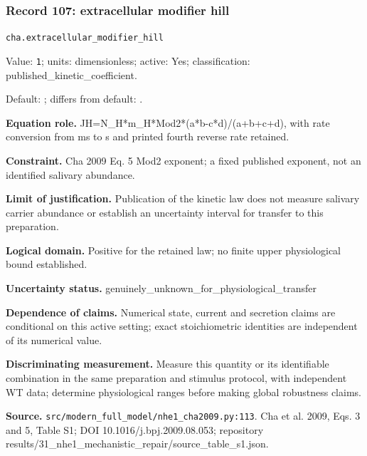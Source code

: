 \subsubsection*{Record 107: extracellular modifier hill}
{\small \nolinkurl{cha.extracellular_modifier_hill}\par

Value: \texttt{1}; units: dimensionless; active: Yes; classification: published\_kinetic\_coefficient.\par

Default: ; differs from default: .\par

\textbf{Equation role.} JH=N\_H*m\_H*Mod2*(a*b-c*d)/(a+b+c+d), with rate conversion from ms to s and printed fourth reverse rate retained.\par

\textbf{Constraint.} Cha 2009 Eq. 5 Mod2 exponent; a fixed published exponent, not an identified salivary abundance.\par

\textbf{Limit of justification.} Publication of the kinetic law does not measure salivary carrier abundance or establish an uncertainty interval for transfer to this preparation.\par

\textbf{Logical domain.} Positive for the retained law; no finite upper physiological bound established.\par

\textbf{Uncertainty status.} genuinely\_unknown\_for\_physiological\_transfer\par

\textbf{Dependence of claims.} Numerical state, current and secretion claims are conditional on this active setting; exact stoichiometric identities are independent of its numerical value.\par

\textbf{Discriminating measurement.} Measure this quantity or its identifiable combination in the same preparation and stimulus protocol, with independent WT data; determine physiological ranges before making global robustness claims.\par

\textbf{Source.} \nolinkurl{src/modern_full_model/nhe1_cha2009.py:113}. Cha et al. 2009, Eqs. 3 and 5, Table S1; DOI 10.1016/j.bpj.2009.08.053; repository results/31\_nhe1\_mechanistic\_repair/source\_table\_s1.json.\par}

